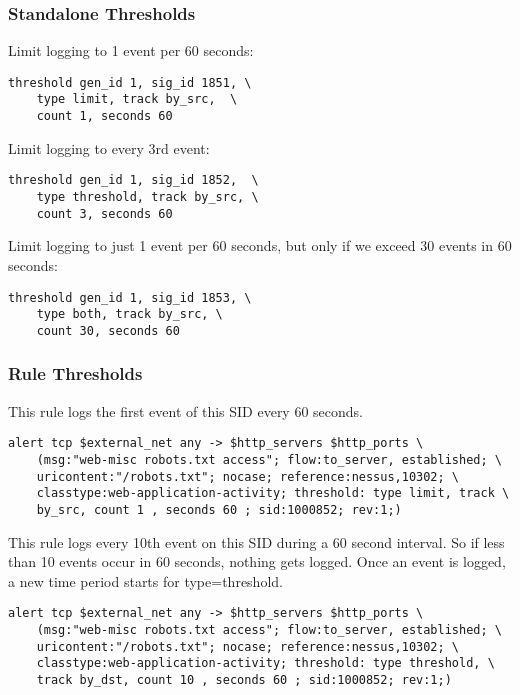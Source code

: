 \documentclass[english]{report}
\begin{document}
\subsubsection{Standalone Thresholds}

Limit logging to 1 event per 60 seconds:
\begin{verbatim}
threshold gen_id 1, sig_id 1851, \
    type limit, track by_src,  \
    count 1, seconds 60
\end{verbatim}

Limit logging to every 3rd event:
\begin{verbatim}
threshold gen_id 1, sig_id 1852,  \
    type threshold, track by_src, \
    count 3, seconds 60
\end{verbatim}

Limit logging to just 1 event per 60 seconds, but only if we exceed 30 events in 60 seconds:
\begin{verbatim}
threshold gen_id 1, sig_id 1853, \
    type both, track by_src, \
    count 30, seconds 60
\end{verbatim}

\subsubsection{Rule Thresholds}

This rule logs the first event of this SID every 60 seconds.

\begin{verbatim}
alert tcp $external_net any -> $http_servers $http_ports \
    (msg:"web-misc robots.txt access"; flow:to_server, established; \
    uricontent:"/robots.txt"; nocase; reference:nessus,10302; \
    classtype:web-application-activity; threshold: type limit, track \
    by_src, count 1 , seconds 60 ; sid:1000852; rev:1;)
\end{verbatim}
                 

This rule logs every 10th event on this SID during a 60 second interval. So if
less than 10 events occur in 60 seconds, nothing gets logged.  Once an event is
logged, a new time period starts for type=threshold.

\begin{verbatim}
alert tcp $external_net any -> $http_servers $http_ports \
    (msg:"web-misc robots.txt access"; flow:to_server, established; \
    uricontent:"/robots.txt"; nocase; reference:nessus,10302; \
    classtype:web-application-activity; threshold: type threshold, \
    track by_dst, count 10 , seconds 60 ; sid:1000852; rev:1;)
\end{verbatim}
\end{document}
